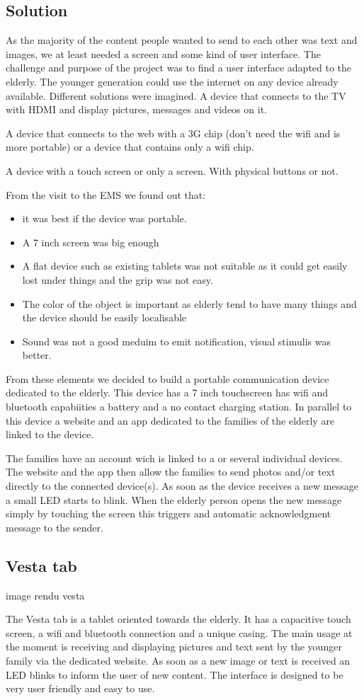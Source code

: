 \subsection{Solution}
As the majority of the content people wanted to send to each other was text and images, we at least needed a screen and some kind of user interface.
The challenge and purpose of the project was to find a user interface adapted to the elderly. The younger generation could use the internet on any device already available.
Different solutions were imagined. A device that connects to the TV with HDMI and display pictures, messages and videos on it.

A device that connects to the web with a 3G chip (don’t need the wifi and is more portable) or a device that contains only a wifi chip.

A device with a touch screen or only a screen. With physical buttons or not.

From the visit to the EMS we found out that:
\begin{itemize}
  \item{it was best if the device was portable. }
  \item{ A 7 inch screen was big enough }
  \item{ A flat device such as existing tablets was not suitable as it could get easily lost under things and the grip was not easy.}
  \item{ The color of the object is important as elderly tend to have many things and the device should be easily localisable}
  \item{ Sound was not a good meduim to emit notification, visual stimulis was better.}
\end{itemize}


From these elements we decided to build a portable communication device dedicated to the elderly. This device has a 7 inch touchscreen has wifi and bluetooth
capabiities a battery and a no contact charging station. In parallel to this device a website and an app dedicated to the families of the elderly are linked to the device.

The families have an account wich is linked to a or several individual devices. The website and the app then allow the families to send photos and/or text directly to the connected device(s).
As soon as the device receives a new message a small LED starts to blink. When the elderly person opens the new message simply by touching the screen this triggers and automatic acknowledgment message to the sender.

\subsection{Vesta tab}
          image rendu vesta

The Vesta tab is a tablet oriented towards the elderly. It has a capacitive touch screen, a wifi and bluetooth connection and a unique casing. The main usage at the moment is receiving and displaying pictures and text sent by the younger family via the dedicated website. As soon as a new image or text is received an LED blinks to inform the user of new content. The interface is designed to be very user friendly and easy to use.

